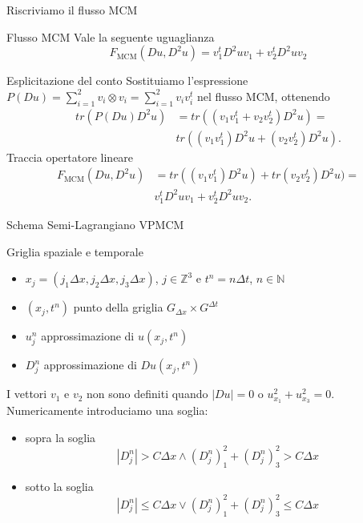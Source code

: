 \begin{frame}{Riscriviamo il flusso MCM}
  \begin{alertblock}{Flusso MCM}
    Vale la seguente uguaglianza
    \[
    F_{\text{MCM}}(Du,D^2u)=v_1^tD^2uv_1+v_2^tD^2uv_2
    \]
  \end{alertblock}
  \begin{block}{Esplicitazione del conto}
  Sostituiamo l'espressione  $P(Du)=\sum_{i=1}^2v_i\otimes
  v_i=\sum_{i=1}^2v_iv_i^t$ nel flusso MCM, ottenendo
  \[
  \begin{aligned}
    tr(P(Du)D^2u)&=tr((v_1v_1^t+v_2v_2^t)D^2u)=\\
    &tr((v_1v_1^t)D^2u+(v_2v_2^t)D^2u).
  \end{aligned}
  \]
  Traccia opertatore lineare
  \[
  \begin{aligned}
    F_{\text{MCM}}(Du,D^2u)&=tr((v_1v_1^t)D^2u)+tr(v_2v_2^t)D^2u)=\\
    &v_1^tD^2uv_1+v_2^tD^2uv_2.
  \end{aligned}
    \]
  \end{block}
\end{frame}

\begin{frame}{Schema Semi-Lagrangiano VPMCM}
  \begin{block}{Griglia spaziale e temporale}
    \begin{itemize}
      \item $x_j=(j_1\Delta x,j_2\Delta x,j_3\Delta x)$,
        $j\in\mathbb{Z}^3$ e $t^n=n\Delta t$, $n\in\mathbb{N}$
      \item $(x_j,t^n)$ punto della griglia $G_{\Delta x}\times
        G^{\Delta t}$
      \item $u_j^n$ approssimazione di $u(x_j,t^n)$
      \item $D_j^n$ approssimazione di $Du(x_j,t^n)$
    \end{itemize}
    \end{block}
  \begin{osservazione}
    I vettori $v_1$ e $v_2$ non sono definiti quando $|Du|=0$ o
    $u_{x_1}^2+u_{x_3}^2=0$. Numericamente introduciamo una soglia:
    \begin{itemize}
    \item \alert{sopra la soglia}
      \[
      |D_j^n|>C\Delta x \land (D_j^n)_1^2+(D_j^n)_3^2>C\Delta x
      \]
    \item \alert{sotto la soglia}
      \[
      |D_j^n|\leq C\Delta x \lor (D_j^n)_1^2+(D_j^n)_3^2\leq C\Delta x
      \]
      \end{itemize}
    \end{osservazione}
\end{frame}

